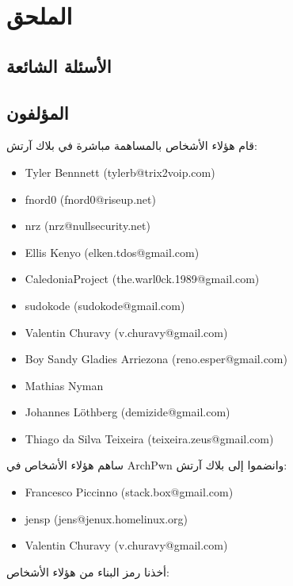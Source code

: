 
\appendix

\chapter{الملحق}

\section{الأسئلة الشائعة}

\section{المؤلفون }
قام هؤلاء الأشخاص بالمساهمة مباشرة في بلاك آرتش:
\begin{itemize}
\item Tyler Bennnett (tylerb@trix2voip.com)
\item fnord0 (fnord0@riseup.net)
\item nrz (nrz@nullsecurity.net)
\item Ellis Kenyo (elken.tdos@gmail.com)
\item CaledoniaProject (the.warl0ck.1989@gmail.com)
\item sudokode (sudokode@gmail.com)
\item Valentin Churavy (v.churavy@gmail.com)
\item Boy Sandy Gladies Arriezona (reno.esper@gmail.com)
\item Mathias Nyman
\item Johannes Löthberg (demizide@gmail.com)
\item Thiago da Silva Teixeira (teixeira.zeus@gmail.com)
\end{itemize}
ساهم هؤلاء الأشخاص في ArchPwn وانضموا إلى بلاك آرتش:

\begin{itemize}
\item Francesco Piccinno (stack.box@gmail.com)
\item jensp (jens@jenux.homelinux.org)
\item Valentin Churavy (v.churavy@gmail.com)
\end{itemize}
أخذنا رمز البناء من هؤلاء الأشخاص:

